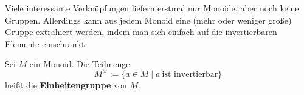 \begin{comment}
\begin{bem}[Beweisarbeit einsparen im kommutativen Fall]
    Im ersten Semester wird typischerweise früher oder später eine Übungsaufgabe \TODO
    Sei $X$ eine Menge mit einer Verknüpfung $*$, die ein neutrales Element $e\in X$ besitzt. Außerdem seien $a,b\in X$ und du vermutest, dass $b$ invers zu $a$ ist. Sofern $*$ eine \emph{kommutative} Verknüpfung ist, brauchst du, um zu beweisen, dass $b$ invers zu $a$ ist, von den beiden Gleichungen
        \[ a*b=e\qquad\text{und}\qquad b*a=e \]
    nur eine zu beweisen. Die andere folgt dann ja aus dem Kommutativgesetz.
\end{bem}
\begin{bem}[Beweisarbeit einsparen im kommutativen Fall]
    Seien $X$ eine Menge mit einer Verknüpfung $*$ und $e\in X$ ein Element, von dem du vermutest, dass es ein neutrales Element ist. Sofern $*$ eine \emph{kommutative Verknüpfung} ist, brauchst du, um zu beweisen, dass $e$ ein neutrales Element ist, von den beiden Gleichungen
        \[ e*x=x \qquad\text{und}\qquad x*e=x \qquad\qquad x\in X \]
    nur eine zu beweisen. Die andere folgt dann ja direkt aus dem Kommutativgesetz. \TODO
\end{bem}
\end{comment}


\noindent Viele interessante Verknüpfungen liefern erstmal nur Monoide, aber noch keine Gruppen. Allerdings kann aus jedem Monoid eine (mehr oder weniger große) Gruppe extrahiert werden, indem man sich einfach auf die invertierbaren Elemente einschränkt:


\begin{defin} 
    Sei $M$ ein Monoid. Die Teilmenge
        \[ M^\times := \{a\in M\mid a\ \text{ist invertierbar} \} \]
    heißt die \textbf{Einheitengruppe} von $M$.
\end{defin}


